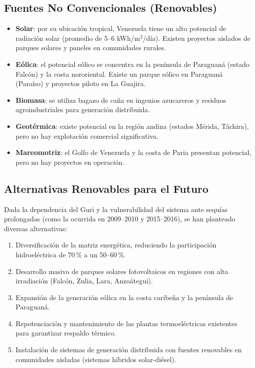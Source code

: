 \documentclass[12pt,a4paper]{article}
\begin{document}
\subsection{Fuentes No Convencionales (Renovables)}

\begin{itemize}[nosep]
    \item \textbf{Solar}: por su ubicación tropical, Venezuela tiene un
          alto potencial de radiación solar (promedio de
          5--6 kWh/m$^2$/día). Existen proyectos aislados de parques
          solares y paneles en comunidades rurales.
    \item \textbf{Eólica}: el potencial eólico se concentra en la
          península de Paraguaná (estado Falcón) y la costa
          nororiental. Existe un parque eólico en Paraguaná (Paraíso)
          y proyectos piloto en La Guajira.
    \item \textbf{Biomasa}: se utiliza bagazo de caña en ingenios
          azucareros y residuos agroindustriales para generación
          distribuida.
    \item \textbf{Geotérmica}: existe potencial en la región andina
          (estados Mérida, Táchira), pero no hay explotación comercial
          significativa.
    \item \textbf{Mareomotriz}: el Golfo de Venezuela y la costa de
          Paria presentan potencial, pero no hay proyectos en
          operación.
\end{itemize}

\subsection{Alternativas Renovables para el Futuro}

Dada la dependencia del Guri y la vulnerabilidad del sistema ante
sequías prolongadas (como la ocurrida en 2009--2010 y 2015--2016), se
han planteado diversas alternativas:

\begin{enumerate}[nosep]
    \item Diversificación de la matriz energética, reduciendo la
          participación hidroeléctrica de 70\,\% a un 50--60\,\%.
    \item Desarrollo masivo de parques solares fotovoltaicos en
          regiones con alta irradiación (Falcón, Zulia, Lara, Anzoátegui).
    \item Expansión de la generación eólica en la costa caribeña y la
          península de Paraguaná.
    \item Repotenciación y mantenimiento de las plantas termoeléctricas
          existentes para garantizar respaldo térmico.
    \item Instalación de sistemas de generación distribuida con fuentes
          renovables en comunidades aisladas (sistemas híbridos
          solar-diésel).
\end{enumerate}
\end{document}
